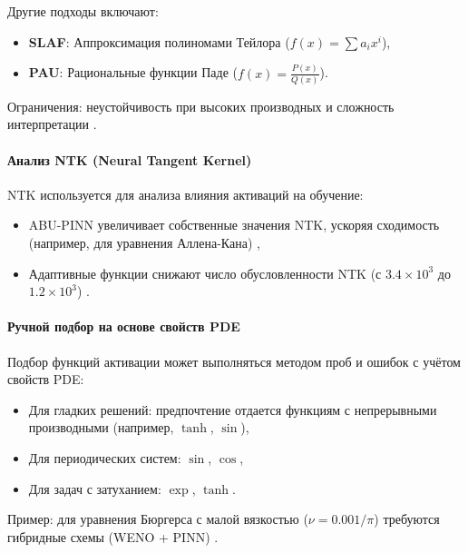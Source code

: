 Другие подходы включают:
\begin{itemize}
    \item \textbf{SLAF}: Аппроксимация полиномами Тейлора ($f(x) = \sum a_i x^i$),
    \item \textbf{PAU}: Рациональные функции Паде ($f(x) = \frac{P(x)}{Q(x)}$).
\end{itemize}
Ограничения: неустойчивость при высоких производных и сложность интерпретации \cite{7fcd4b3c875d8e41eb0c184aa1a42bf4c8906d61}.

\paragraph{Анализ NTK (Neural Tangent Kernel)}
NTK используется для анализа влияния активаций на обучение:
\begin{itemize}
    \item ABU-PINN увеличивает собственные значения NTK, ускоряя сходимость (например, для уравнения Аллена-Кана) \cite{7fcd4b3c875d8e41eb0c184aa1a42bf4c8906d61},
    \item Адаптивные функции снижают число обусловленности NTK (с $3.4 \times 10^3$ до $1.2 \times 10^3$) \cite{Sutfeld2018-io}.
\end{itemize}

\paragraph{Ручной подбор на основе свойств PDE}
Подбор функций активации может выполняться методом проб и ошибок с учётом свойств PDE:
\begin{itemize}
    \item Для гладких решений: предпочтение отдается функциям с непрерывными производными (например, $\tanh$, $\sin$),
    \item Для периодических систем: $\sin$, $\cos$,
    \item Для задач с затуханием: $\exp$, $\tanh$.
\end{itemize}
Пример: для уравнения Бюргерса с малой вязкостью ($\nu = 0.001/\pi$) требуются гибридные схемы (WENO + PINN) \cite{0d752c79fb816703274a3d37f85a85689a2a9405}\cite{7fcd4b3c875d8e41eb0c184aa1a42bf4c8906d61}.

